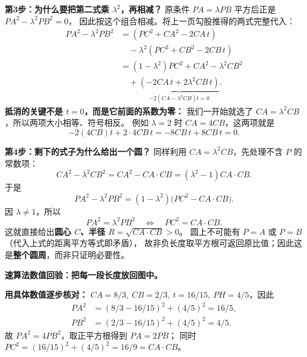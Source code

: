 \begin{proofbox}
\tcbbreak
\textbf{第3步：为什么要把第二式乘 $\lambda^2$，再相减？}
原条件 $PA=\lambda PB$ 平方后正是 $PA^2-\lambda^2PB^2=0$，
因此按这个组合相减。将上一页勾股推得的两式完整代入：
\[
\begin{aligned}
 PA^2-\lambda^2PB^2
 &=(PC^2+CA^2-2CA\,t)\\
 &\quad-\lambda^2(PC^2+CB^2-2CB\,t)\\
 &=(1-\lambda^2)PC^2+CA^2-\lambda^2CB^2\\
 &\quad+\underbrace{(-2CA\,t+2\lambda^2CB\,t)}_{-2(CA-\lambda^2CB)t=0}.
\end{aligned}
\]
\textbf{抵消的关键不是 $t=0$，而是它前面的系数为零：}
我们一开始就选了 $CA=\lambda^2CB$，所以两项大小相等、符号相反。
例如 $\lambda=2$ 时 $CA=4CB$，这两项就是
\[
 -2(4CB)t+2\cdot4CB\,t=-8CB\,t+8CB\,t=0.
\]

\textbf{第4步：剩下的式子为什么给出一个圆？}
同样利用 $CA=\lambda^2CB$，先处理不含 $P$ 的常数项：
\[
 CA^2-\lambda^2CB^2
 =CA^2-CA\cdot CB
 =(\lambda^2-1)CA\cdot CB.
\]
于是
\[
 PA^2-\lambda^2PB^2
 =(1-\lambda^2)\bigl(PC^2-CA\cdot CB\bigr).
\]
因 $\lambda\ne1$，所以
\[
 PA^2=\lambda^2PB^2\quad\Longleftrightarrow\quad
 \boxed{PC^2=CA\cdot CB}.
\]
这就直接给出\textbf{圆心 $C$、半径 $R=\sqrt{CA\cdot CB}>0$}。
圆上不可能有 $P=A$ 或 $P=B$（代入上式的距离平方等式即矛盾），
故非负长度取平方根可返回原比值；因此这是\textbf{整个圆周}，而非只证明必要性。

\tcbbreak
\textbf{速算法数值回验：把每一段长度放回图中。}

\textbf{用具体数值逐步核对：}
$CA=8/3,\ CB=2/3,\ t=16/15,\ PH=4/5$，因此
\[
\begin{aligned}
 PA^2&=(8/3-16/15)^2+(4/5)^2=16/5,\\
 PB^2&=(2/3-16/15)^2+(4/5)^2=4/5.
\end{aligned}
\]
故 $PA^2=4PB^2$，取正平方根得到 $PA=2PB$；
同时 $PC^2=(16/15)^2+(4/5)^2=16/9=CA\cdot CB$。


\end{proofbox}
